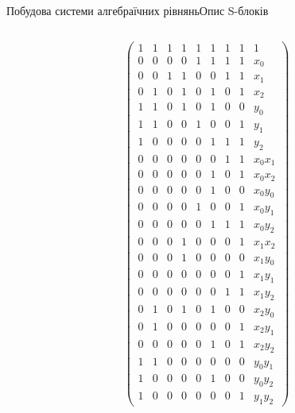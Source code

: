 \documentclass[10pt, ucs]{beamer}
\begin{document}
\begin{frame}{Побудова системи алгебраїчних рівнянь}{Опис S-блоків}
\begin{columns}
        \begin{column}{0.5\textwidth}
            \small
            \begin{equation}
                \nonumber
                \left(
                \begin{array}{lllllllll}
                    1 & 1 & 1 & 1 & 1 & 1 & 1 & 1 & 1       \\[-0.5ex]
                    0 & 0 & 0 & 0 & 1 & 1 & 1 & 1 & x_0     \\[-0.5ex]
                    0 & 0 & 1 & 1 & 0 & 0 & 1 & 1 & x_1     \\[-0.5ex]
                    0 & 1 & 0 & 1 & 0 & 1 & 0 & 1 & x_2     \\[-0.5ex]
                    1 & 1 & 0 & 1 & 0 & 1 & 0 & 0 & y_0     \\[-0.5ex]
                    1 & 1 & 0 & 0 & 1 & 0 & 0 & 1 & y_1     \\[-0.5ex]
                    1 & 0 & 0 & 0 & 0 & 1 & 1 & 1 & y_2     \\[-0.5ex]
                    0 & 0 & 0 & 0 & 0 & 0 & 1 & 1 & x_0 x_1 \\[-0.5ex]
                    0 & 0 & 0 & 0 & 0 & 1 & 0 & 1 & x_0 x_2 \\[-0.5ex]
                    0 & 0 & 0 & 0 & 0 & 1 & 0 & 0 & x_0 y_0 \\[-0.5ex]
                    0 & 0 & 0 & 0 & 1 & 0 & 0 & 1 & x_0 y_1 \\[-0.5ex]
                    0 & 0 & 0 & 0 & 0 & 1 & 1 & 1 & x_0 y_2 \\[-0.5ex]
                    0 & 0 & 0 & 1 & 0 & 0 & 0 & 1 & x_1 x_2 \\[-0.5ex]
                    0 & 0 & 0 & 1 & 0 & 0 & 0 & 0 & x_1 y_0 \\[-0.5ex]
                    0 & 0 & 0 & 0 & 0 & 0 & 0 & 1 & x_1 y_1 \\[-0.5ex]
                    0 & 0 & 0 & 0 & 0 & 0 & 1 & 1 & x_1 y_2 \\[-0.5ex]
                    0 & 1 & 0 & 1 & 0 & 1 & 0 & 0 & x_2 y_0 \\[-0.5ex]
                    0 & 1 & 0 & 0 & 0 & 0 & 0 & 1 & x_2 y_1 \\[-0.5ex]
                    0 & 0 & 0 & 0 & 0 & 1 & 0 & 1 & x_2 y_2 \\[-0.5ex]
                    1 & 1 & 0 & 0 & 0 & 0 & 0 & 0 & y_0 y_1 \\[-0.5ex]
                    1 & 0 & 0 & 0 & 0 & 1 & 0 & 0 & y_0 y_2 \\[-0.5ex]
                    1 & 0 & 0 & 0 & 0 & 0 & 0 & 1 & y_1 y_2
                \end{array} \right)
            \end{equation}
        \end{column}%
    \end{columns}
\end{frame}
\end{document}
